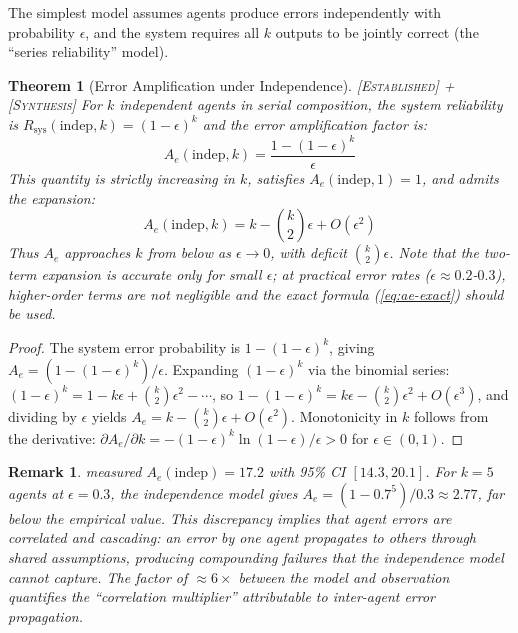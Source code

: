 \documentclass[11pt, a4paper, logo, copyright]{googledeepmind}
\newtheorem{theorem}{Theorem}[section]
\newtheorem*{remark}{Remark}
\newcommand{\established}{\textsc{[Established]}}
\newcommand{\synthesis}{\textsc{[Synthesis]}}
\begin{document}
The simplest model assumes agents produce errors independently with probability $\epsilon$, and the system requires all $k$ outputs to be jointly correct (the ``series reliability'' model).

\begin{theorem}[Error Amplification under Independence] \established{} + \synthesis{}
\label{thm:error-amp}
For $k$ independent agents in serial composition, the system reliability is $R_{\mathrm{sys}}(\mathrm{indep}, k) = (1 - \epsilon)^k$ and the error amplification factor is:
\begin{equation}
\label{eq:ae-exact}
  A_e(\mathrm{indep}, k) = \frac{1 - (1-\epsilon)^k}{\epsilon}
\end{equation}
This quantity is strictly increasing in $k$, satisfies $A_e(\mathrm{indep}, 1) = 1$, and admits the expansion:
\begin{equation}
\label{eq:ae-expansion}
  A_e(\mathrm{indep}, k) = k - \binom{k}{2}\epsilon + O(\epsilon^2)
\end{equation}
Thus $A_e$ approaches $k$ from below as $\epsilon \to 0$, with deficit $\binom{k}{2}\epsilon$.
Note that the two-term expansion is accurate only for small $\epsilon$; at practical error rates ($\epsilon \approx 0.2$-$0.3$), higher-order terms are not negligible and the exact formula (\ref{eq:ae-exact}) should be used.
\end{theorem}

\begin{proof}
The system error probability is $1 - (1-\epsilon)^k$, giving $A_e = (1 - (1-\epsilon)^k)/\epsilon$.
Expanding $(1-\epsilon)^k$ via the binomial series:
$(1-\epsilon)^k = 1 - k\epsilon + \binom{k}{2}\epsilon^2 - \cdots$,
so $1 - (1-\epsilon)^k = k\epsilon - \binom{k}{2}\epsilon^2 + O(\epsilon^3)$,
and dividing by $\epsilon$ yields $A_e = k - \binom{k}{2}\epsilon + O(\epsilon^2)$.
Monotonicity in $k$ follows from the derivative: $\partial A_e / \partial k = -(1-\epsilon)^k \ln(1-\epsilon)/\epsilon > 0$ for $\epsilon \in (0,1)$.
\end{proof}

\begin{remark}
\label{rem:discrepancy}
\citet{Kim2025} measured $A_e(\mathrm{indep}) = 17.2$ with 95\% CI $[14.3, 20.1]$.
For $k = 5$ agents at $\epsilon = 0.3$, the independence model gives $A_e = (1 - 0.7^5)/0.3 \approx 2.77$, far below the empirical value.
This discrepancy implies that agent errors are correlated and cascading: an error by one agent propagates to others through shared assumptions, producing compounding failures that the independence model cannot capture.
The factor of $\approx 6\times$ between the model and observation quantifies the ``correlation multiplier'' attributable to inter-agent error propagation.
\end{remark}
\end{document}
